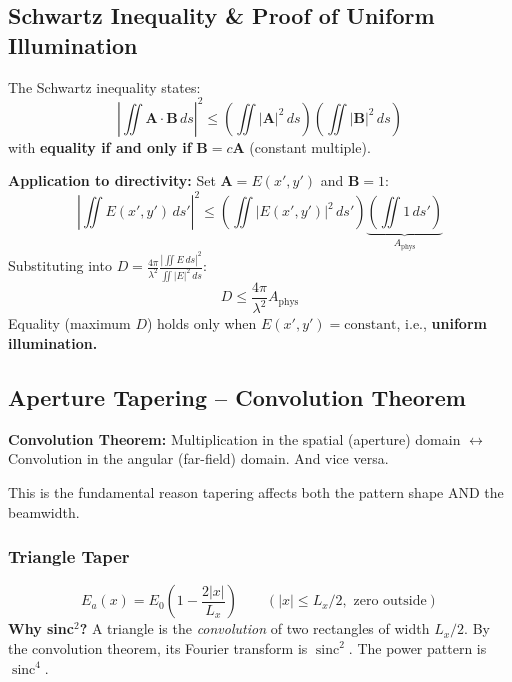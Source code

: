\documentclass[10pt,letterpaper]{article}
\newcommand{\Aphys}{A_{\mathrm{phys}}}
\newcommand{\sinc}{\operatorname{sinc}}
\begin{document}
\subsection{Schwartz Inequality \& Proof of Uniform Illumination}

\begin{tcolorbox}[purplebox, title={Schwartz Inequality Proof}]
The Schwartz inequality states:
\begin{equation}
  \left|\iint \mathbf{A}\cdot\mathbf{B}\,ds\right|^2 \leq \left(\iint|\mathbf{A}|^2\,ds\right)\!\left(\iint|\mathbf{B}|^2\,ds\right)
\end{equation}
with \textbf{equality if and only if} $\mathbf{B} = c\mathbf{A}$ (constant multiple).

\textbf{Application to directivity:} Set $\mathbf{A} = E(x',y')$ and $\mathbf{B} = 1$:
\begin{equation}
  \left|\iint E(x',y')\,ds'\right|^2 \leq \left(\iint|E(x',y')|^2\,ds'\right)\!\underbrace{\left(\iint 1\,ds'\right)}_{\Aphys}
\end{equation}
Substituting into $D = \frac{4\pi}{\lambda^2}\frac{|\iint E\,ds|^2}{\iint|E|^2\,ds}$:
\begin{equation}
  D \leq \frac{4\pi}{\lambda^2}\Aphys
\end{equation}
Equality (maximum $D$) holds only when $E(x',y') = \mathrm{constant}$, i.e., \textbf{uniform illumination.}
\end{tcolorbox}

\subsection{Aperture Tapering -- Convolution Theorem}

\begin{tcolorbox}[keybox, title={Convolution Theorem in Aperture Context}]
\textbf{Convolution Theorem:} Multiplication in the spatial (aperture) domain $\leftrightarrow$ Convolution in the angular (far-field) domain. And vice versa.

This is the fundamental reason tapering affects both the pattern shape AND the beamwidth.
\end{tcolorbox}

\subsubsection{Triangle Taper}
\begin{equation}
  E_a(x) = E_0\left(1 - \frac{2|x|}{L_x}\right) \qquad (|x|\leq L_x/2, \text{ zero outside})
\end{equation}
\textbf{Why sinc$^2$?} A triangle is the \emph{convolution} of two rectangles of width $L_x/2$. By the convolution theorem, its Fourier transform is $\sinc^2$. The power pattern is $\sinc^4$.
\end{document}
